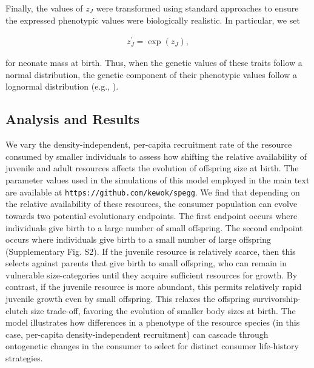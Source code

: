 \documentclass[11pt]{article}
\begin{document}
\begin{linenumbers}
Finally, the values of $z_J$ were transformed using standard approaches to ensure the expressed phenotypic values were biologically realistic. In particular, we set  
\begin{linenomath}
\begin{eqnarray}
\label{eqn:survivorship}
z_J^{\prime} = \exp(z_J),
\end{eqnarray}
\end{linenomath}
for neonate mass at birth. Thus, when the genetic values of these traits follow a normal distribution, the genetic component of their phenotypic values follow a lognormal distribution (e.g., \citealt{lynch97}).


\subsection*{Analysis and Results}
We vary the density-independent, per-capita recruitment rate of the resource consumed by smaller individuals to assess how shifting the relative availability of juvenile and adult resources affects the evolution of offspring size at birth.  The parameter values used in the simulations of this model employed in the main text are available at \nolinkurl{https://github.com/kewok/spegg}. We find that depending on the relative availability of these resources, the consumer population can evolve towards two potential evolutionary endpoints. The first endpoint occurs where individuals give birth to a large number of small offspring. The second endpoint occurs where individuals give birth to a small number of large offspring (Supplementary Fig. S2). If the juvenile resource is relatively scarce, then this selects against parents that give birth to small offspring, who can remain in vulnerable size-categories until they acquire sufficient resources for growth. By contrast, if the juvenile resource is more abundant, this permits relatively rapid juvenile growth even by small offspring. This relaxes the offspring survivorship-clutch size trade-off, favoring the evolution of smaller body sizes at birth. The model illustrates how differences in a phenotype of the resource species (in this case, per-capita density-independent recruitment) can cascade through ontogenetic changes in the consumer to select for distinct consumer life-history strategies.

\end{linenumbers}

	

\end{document}
